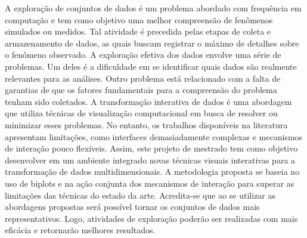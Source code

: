 \begin{resumo}
%
A exploração de conjuntos de dados é um problema abordado
com frequência em computação e tem como objetivo uma melhor
compreensão de fenômenos simulados ou medidos.
%
Tal atividade é precedida pelas etapas de coleta e
armazenamento de dados, as quais buscam registrar o máximo
de detalhes sobre o fenômeno observado.
%
A exploração efetiva dos dados envolve uma série de
problemas. 
%
Um deles é a dificuldade em se identificar quais
dados são realmente relevantes para as
análises. 
%
Outro problema está relacionado com a falta de
garantias de que os fatores fundamentais para a compreensão
do problema tenham sido coletados.
% 
A transformação interativa de dados é uma abordagem que
utiliza técnicas de visualização computacional em busca de
resolver ou minimizar esses problemas. 
%
No entanto, os trabalhos disponíveis na literatura
apresentam limitações, como interfaces demasiadamente
complexas e mecanismos de interação pouco flexíveis. 
%
Assim, este projeto de mestrado tem como objetivo
desenvolver em um ambiente integrado novas técnicas visuais
interativas para a transformação de dados multidimensionais.
%
A metodologia proposta se baseia no uso de biplots e na
ação conjunta dos mecanismos de interação para superar as
limitações das técnicas do estado da arte.
%
Acredita-se que ao se utilizar as abordagens propostas 
será possível tornar os conjuntos de dados mais
representativos. 
%
Logo, atividades de exploração poderão ser
realizadas com mais eficácia e retornarão melhores
resultados.
\end{resumo}
